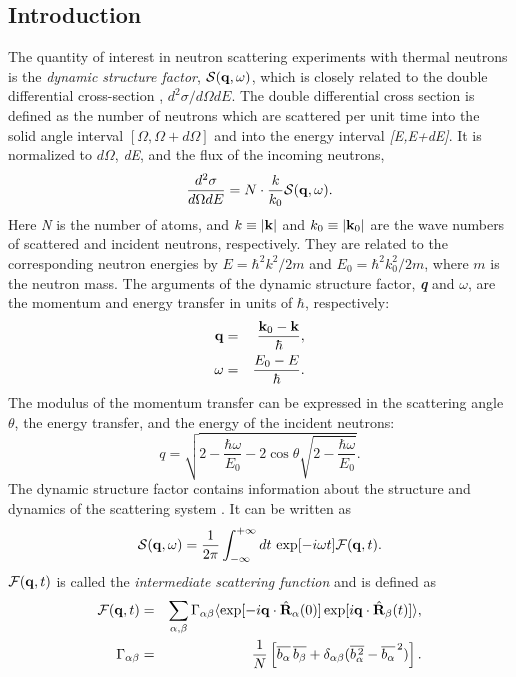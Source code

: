 \documentclass[a4paper,11pt]{article}
\begin{document}
\subsection{Introduction}
\label{scattering_introduction}
The quantity of interest in neutron scattering experiments with thermal neutrons is the {\em dynamic structure factor},
${\cal S}({\bf q},\omega)$, which is closely related to the double differential cross-section \cite{Lovesey},
$d^2\sigma/d\Omega dE$.  The double differential cross section is defined as the number of neutrons which
are scattered per unit time into the solid angle interval $[\Omega,\Omega+d\Omega]$ and into the energy interval \textit{[E,E+dE]}.
It is normalized to $d\Omega$, \textit{dE}, and the flux of the incoming neutrons,
\begin{equation}
\label{eq:sqw_1}
\frac{d^{2}\sigma}{d\Omega dE} = N\cdot\frac{k}{k_0}{\cal S}({\bf q},\omega).
\end{equation}
Here \textit{N} is the number of atoms, and $k\equiv|{\bf k}|$  and $k_0\equiv |{\bf k}_0|$ are the wave numbers of scattered and
incident neutrons, respectively. They are related to the corresponding neutron energies by
$E = \hbar^2 k^2/2m$ and $E_0 = \hbar^2 k_0^2/2m$, where $m$ is the neutron mass. The arguments of the dynamic structure
factor, \textit{\textbf{q}} and $\omega$, are the momentum and energy transfer in units of $\hbar$, respectively:
\begin{eqnarray}
{\bf q} &= &\frac{{\bf k}_0 - {\bf k}}{\hbar},\\
\omega  &= &\frac{E_0 - E}{\hbar}.
\end{eqnarray}
The modulus of the momentum transfer can be expressed in the scattering angle $\theta$, the energy transfer, and the energy of
the incident neutrons:
\begin{equation}
q = \sqrt{2 - \frac{\hbar\omega}{E_0}
          - 2\cos\theta\sqrt{2 - \frac{\hbar\omega}{E_0}}}.
\end{equation}
The dynamic structure factor contains information about the structure and dynamics of the scattering system \cite{VanHove}.
It can be written as
\begin{equation}
\label{eq:sqw_2}
{\cal S}({\bf q},\omega) = \frac{1}{2\pi}\int_{-\infty}^{+\infty}dt\, \exp[-i\omega t]{\cal F}({\bf q},t).
\end{equation}
${\cal F}({\bf q},t)$ is called the {\em intermediate scattering function} and is defined as
\begin{eqnarray}
\label{eq:fqt}
{\cal F}({\bf q},t) &= &\sum\limits_{\alpha,\beta}\Gamma_{\alpha\beta}
\langle\exp[-i{\bf q}\cdot\hat{\bf R}_\alpha(0)]
       \exp[i{\bf q}\cdot\hat{\bf R}_\beta(t)]\rangle,\\
\label{eq:gamma}
\Gamma_{\alpha\beta} &= &\frac{1}{N}
\left[\overline{\mbox{$b_\alpha$}}\,\overline{\mbox{$b_\beta$}}
+ \delta_{\alpha\beta}
 (\overline{b_\alpha^{\,2}} - \overline{b_\alpha}^{\,2})\right].
\end{eqnarray}
\end{document}
